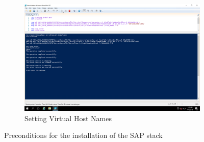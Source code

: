 \begin{figure}[!htb]\ContinuedFloat
    \begin{subfigure}{0.5\textwidth}
        \captionsetup{width=0.8\linewidth}
        \includegraphics[width=0.9\linewidth]{img/Methodologie/Precondition6.png}
        \centering
        \caption{Setting Virtual Host Names}
    \end{subfigure}
    \caption[Preconditions SAP]{Preconditions for the installation of the SAP stack}
    \label{fig:Preconditions}
\end{figure}
\clearpage

